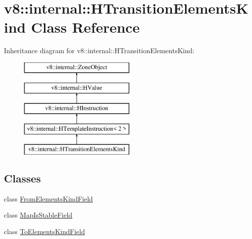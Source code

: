 \hypertarget{classv8_1_1internal_1_1_h_transition_elements_kind}{}\section{v8\+:\+:internal\+:\+:H\+Transition\+Elements\+Kind Class Reference}
\label{classv8_1_1internal_1_1_h_transition_elements_kind}
Inheritance diagram for v8\+:\+:internal\+:\+:H\+Transition\+Elements\+Kind\+:\begin{figure}[H]
\begin{center}
\leavevmode
\includegraphics[height=5.000000cm]{classv8_1_1internal_1_1_h_transition_elements_kind}
\end{center}
\end{figure}
\subsection*{Classes}
\begin{DoxyCompactItemize}
\item 
class \hyperlink{classv8_1_1internal_1_1_h_transition_elements_kind_1_1_from_elements_kind_field}{From\+Elements\+Kind\+Field}
\item 
class \hyperlink{classv8_1_1internal_1_1_h_transition_elements_kind_1_1_map_is_stable_field}{Map\+Is\+Stable\+Field}
\item 
class \hyperlink{classv8_1_1internal_1_1_h_transition_elements_kind_1_1_to_elements_kind_field}{To\+Elements\+Kind\+Field}
\end{DoxyCompactItemize}
